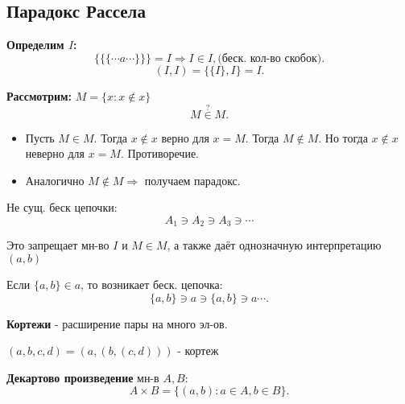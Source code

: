 \subsection{Парадокс Рассела}
\textbf{Определим $I$:}
\[
\{\{\{\cdots a\cdots \}\}\} = I \Rightarrow I \in I, \text{(беск. кол-во скобок)}
.\] 
\[
    (I, I) = \{\{I\}, I\} = I
.\] 

\textbf{Рассмотрим:} $M = \{x \colon x \not\in x\}$
\[
    M \overset{\text{?}}{\in } M
.\] 
\begin{itemize}
    \item Пусть $M \in M$. Тогда $x \not\in x$ верно для $x = M$. Тогда $M \not\in M$. Но тогда $x \not\in x$ неверно для $x = M$. Противоречие.
    \item Аналогично  $M \not\in M \Rightarrow $ получаем парадокс.
\end{itemize}

\begin{axiom} 
    Не сущ. беск цепочки:
    \[
        A_1 \ni A_2 \ni A_3 \ni \cdots
    \]
\end{axiom}
\begin{note}
Это запрещает мн-во $I \text{ и } M \in M$, а также даёт однозначную интерпретацию $(a, b)$ 

Если $\{a, b\} \in a$, то возникает беск. цепочка:
\[
\{a, b\} \ni a \ni \{a, b\} \ni a \cdots 
.\] 
\end{note}

\begin{definition}
\textbf{Кортежи} - расширение пары на много эл-ов.
\begin{example}
$(a, b, c, d) = (a, (b, (c, d)))$ - кортеж
\end{example}

\begin{definition}
\textbf{Декартово произведение} мн-в $A, B$:
 \[
A\times B = \{(a, b) \colon a \in A, b \in B\}
.\] 
\end{definition}


\end{definition}

